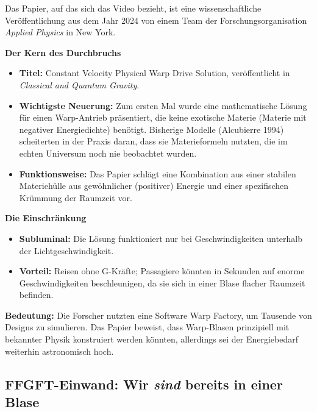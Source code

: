 \documentclass[11pt,a4paper]{article}
\begin{document}
\begin{geminibox}
Das Papier, auf das sich das Video bezieht, ist eine wissenschaftliche Ver\"offentlichung aus dem Jahr 2024 von einem Team der Forschungsorganisation \emph{Applied Physics} in New York.

\textbf{Der Kern des Durchbruchs}
\begin{itemize}[leftmargin=1.2em]
  \item \textbf{Titel:} \glqq Constant Velocity Physical Warp Drive Solution\grqq, ver\"offentlicht in \emph{Classical and Quantum Gravity}.
  \item \textbf{Wichtigste Neuerung:} Zum ersten Mal wurde eine mathematische L\"osung f\"ur einen Warp-Antrieb pr\"asentiert, die keine \glqq exotische Materie\grqq{} (Materie mit negativer Energiedichte) ben\"otigt. Bisherige Modelle (Alcubierre 1994) scheiterten in der Praxis daran, dass sie Materieformeln nutzten, die im echten Universum noch nie beobachtet wurden.
  \item \textbf{Funktionsweise:} Das Papier schl\"agt eine Kombination aus einer stabilen Materieh\"ulle aus gew\"ohnlicher (positiver) Energie und einer spezifischen Kr\"ummung der Raumzeit vor.
\end{itemize}

\textbf{Die Einschr\"ankung}
\begin{itemize}[leftmargin=1.2em]
  \item \textbf{Subluminal:} Die L\"osung funktioniert nur bei Geschwindigkeiten unterhalb der Lichtgeschwindigkeit.
  \item \textbf{Vorteil:} Reisen ohne G-Kr\"afte; Passagiere k\"onnten in Sekunden auf enorme Geschwindigkeiten beschleunigen, da sie sich in einer Blase flacher Raumzeit befinden.
\end{itemize}

\textbf{Bedeutung:} Die Forscher nutzten eine Software \glqq Warp Factory\grqq, um Tausende von Designs zu simulieren. Das Papier beweist, dass Warp-Blasen prinzipiell mit bekannter Physik konstruiert werden k\"onnten, allerdings sei der Energiebedarf weiterhin astronomisch hoch.
\end{geminibox}

\subsection{FFGFT-Einwand: Wir \emph{sind} bereits in einer Blase}
\end{document}
